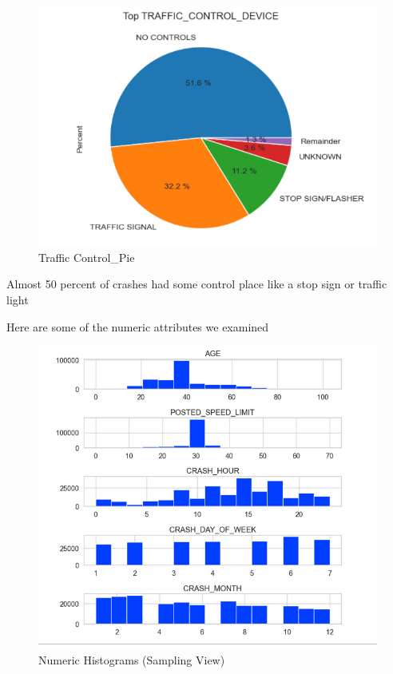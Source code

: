 \documentclass[conference]{IEEEtran}
\begin{document}
 \begin{figure}[!h]
	\includegraphics[width=\linewidth]{Traffic_Control_Pie.png}
	\caption{Traffic Control_Pie}
	\label{fig: Traffic_Control_Pie}
 \end{figure}

 Almost 50 percent of crashes had some control place like a stop sign or traffic light

 Here are some of the numeric attributes we examined
 \begin{figure}[!h]
	\includegraphics[width=\linewidth]{Numerical_Hist.png}
	\caption{Numeric Histograms (Sampling View)}
	\label{fig: Numeric Histograms}
 \end{figure}
\end{document}
